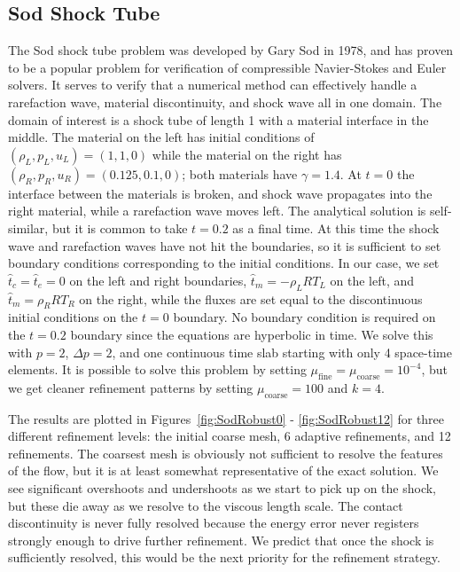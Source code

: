 \documentclass[Dissertation.tex]{subfiles}
\begin{document}
\subsection{Sod Shock Tube}
The Sod shock tube problem was developed by Gary Sod in 1978\cite{Sod1978}, and has proven to be a popular problem for verification 
of compressible Navier-Stokes and Euler solvers.
It serves to verify that a numerical method can effectively handle a rarefaction wave, material discontinuity, and shock wave
all in one domain.
The domain of interest is a shock tube of length 1 with a material interface in the middle. The material on the left has initial conditions of 
$(\rho_L,p_L,u_L)=(1,1,0)$ while the material on the right has $(\rho_R,p_R,u_R)=(0.125,0.1,0)$; both materials have $\gamma=1.4$. 
At $t=0$ the interface between the materials is broken, 
and shock wave propagates into the right material, while a rarefaction wave moves left. The analytical solution is self-similar, but it is common to take
$t=0.2$ as a final time.
At this time the shock wave and rarefaction waves have not hit the boundaries, 
so it is sufficient to set boundary conditions corresponding to the initial conditions.
In our case, we set $\hat t_c=\hat t_e=0$ on the left and right boundaries,
$\hat t_m=-\rho_LRT_L$ on the left, and $\hat t_m=\rho_RRT_R$ on the right,
while the fluxes are set equal to the discontinuous initial conditions on the $t=0$ boundary. 
No boundary condition is required on the $t=0.2$ boundary since the equations are hyperbolic in time.
We solve this with $p=2$, $\Delta p=2$, and one continuous time slab starting with only 4 space-time elements.
It is possible to solve this problem by setting $\mu_\text{fine}=\mu_\text{coarse}=10^{-4}$, 
but we get cleaner refinement patterns by setting $\mu_\text{coarse}=100$ and $k=4$.

The results are plotted in Figures~\ref{fig:SodRobust0} - \ref{fig:SodRobust12} for three different refinement levels: the initial coarse mesh, 6 adaptive refinements, and 12 refinements.
The coarsest mesh is obviously not sufficient to resolve the features of the flow, but it is at least somewhat representative of the exact solution.
We see significant overshoots and undershoots as we start to pick up on the shock, but these die away as we resolve to the viscous length scale.
The contact discontinuity is never fully resolved because the energy error never registers
strongly enough to drive further refinement. 
We predict that once the shock is sufficiently resolved,
this would be the next priority for the refinement strategy.
\end{document}
